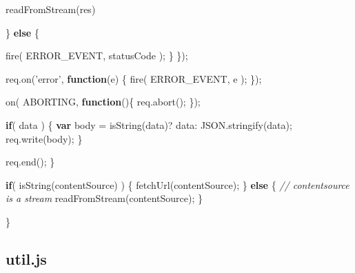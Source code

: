 \documentclass[]{article}
\newenvironment{Shaded}{}{}
\newcommand{\KeywordTok}[1]{\textcolor[rgb]{0.00,0.44,0.13}{\textbf{{#1}}}}
\newcommand{\StringTok}[1]{\textcolor[rgb]{0.25,0.44,0.63}{{#1}}}
\newcommand{\CommentTok}[1]{\textcolor[rgb]{0.38,0.63,0.69}{\textit{{#1}}}}
\newcommand{\OtherTok}[1]{\textcolor[rgb]{0.00,0.44,0.13}{{#1}}}
\newcommand{\FunctionTok}[1]{\textcolor[rgb]{0.02,0.16,0.49}{{#1}}}
\newcommand{\NormalTok}[1]{{#1}}
\begin{document}
\begin{Shaded}
\begin{Highlighting}[]
            \FunctionTok{readFromStream}\NormalTok{(res)}
            
         \NormalTok{\} }\KeywordTok{else} \NormalTok{\{}
         
            \FunctionTok{fire}\NormalTok{( ERROR_EVENT, statusCode );}
         \NormalTok{\}      }
      \NormalTok{\});}
      
      \OtherTok{req}\NormalTok{.}\FunctionTok{on}\NormalTok{(}\StringTok{'error'}\NormalTok{, }\KeywordTok{function}\NormalTok{(e) \{}
         \FunctionTok{fire}\NormalTok{( ERROR_EVENT, e );}
      \NormalTok{\});}
      
      \FunctionTok{on}\NormalTok{( ABORTING, }\KeywordTok{function}\NormalTok{()\{              }
         \OtherTok{req}\NormalTok{.}\FunctionTok{abort}\NormalTok{();}
      \NormalTok{\});}
         
      \KeywordTok{if}\NormalTok{( data ) \{}
         \KeywordTok{var} \NormalTok{body = }\FunctionTok{isString}\NormalTok{(data)? data: }\OtherTok{JSON}\NormalTok{.}\FunctionTok{stringify}\NormalTok{(data);}
         \OtherTok{req}\NormalTok{.}\FunctionTok{write}\NormalTok{(body);}
      \NormalTok{\}}
      
      \OtherTok{req}\NormalTok{.}\FunctionTok{end}\NormalTok{();         }
   \NormalTok{\}}
   
   \KeywordTok{if}\NormalTok{( }\FunctionTok{isString}\NormalTok{(contentSource) ) \{}
      \FunctionTok{fetchUrl}\NormalTok{(contentSource);}
   \NormalTok{\} }\KeywordTok{else} \NormalTok{\{}
      \CommentTok{// contentsource is a stream}
      \FunctionTok{readFromStream}\NormalTok{(contentSource);   }
   \NormalTok{\}}

\NormalTok{\}}
\end{Highlighting}
\end{Shaded}

\pagebreak

\subsection{util.js}
\end{document}
